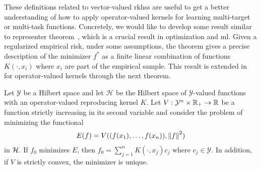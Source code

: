 These definitions related to vector-valued \acrshort{rkhss} are useful to get a better understanding of how to apply operator-valued kernels for learning multi-target or multi-task functions. Concretely, we would like to develop some result similar to representer theorem~\cite{ScholkopfHS01}, which is a crucial result in optimization and \acrshort{ml}. Given a regularized empirical risk, under some assumptions, the theorem gives a precise description of the minimizer $f^*$ as a finite linear combination of functions $K(\cdot, x_i)$ where $x_i$ are part of the empirical sample.
This result is extended in~\citet[Theorem 4.2]{MicchelliP05} for operator-valued kernels through the next theorem.
\begin{theorem}
    Let $\mathcal{Y}$ be a Hilbert space and let $\mathcal{H}$ be the Hilbert space of $\mathcal{Y}$-valued functions with an operator-valued reproducing kernel $K$. Let $V: \mathcal{Y}^n \times \mathbb{R}_+ \to \mathbb{R}$ be a function strictly increasing in its second variable and consider the problem of minimizing the functional
    \begin{equation}\label{eq:representer_functional}
        \begin{aligned}
            E(f) = V((f(x_1), \ldots, f(x_n)), \norm{f}^2)
        \end{aligned}
    \end{equation}
    in $\mathcal{H}$.
    If
    $f_0$ minimizes $E$, then $f_0 = \sum_{j=1}^n K(\cdot, x_j) c_j$ where $c_j \in \mathcal{Y}$. In addition, if $V$ is strictly convex, the minimizer is unique.
\end{theorem}

